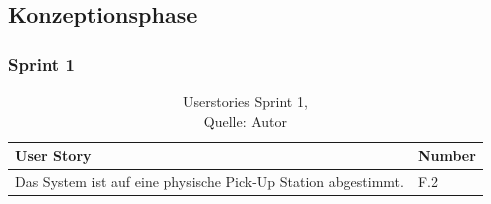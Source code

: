 \subsection{Konzeptionsphase}
\subsubsection{Sprint 1}\label{Sprint1}
\begin{table}[H]
	\begin{tabularx}{\textwidth}{|l|X|}
		\hline
		User Story & Number \\
		\hline
		Das System ist auf eine physische Pick-Up Station abgestimmt. & F.2\\
		\hline
	\end{tabularx} 
\caption[Userstories Sprint 1]{Userstories Sprint 1,\\ Quelle: Autor}
\end{table}\label{userStoriesSprint1}


